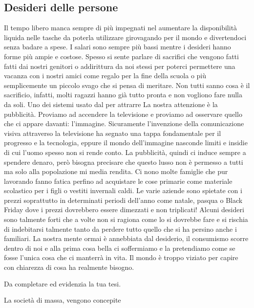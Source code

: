 \documentclass{article}
\begin{document}
\vspace{2cm}

\subsection{Desideri delle persone}

Il tempo libero manca sempre di più impegnati nel aumentare la disponibilità liquida
nelle tasche da poterla utilizzare girovagando per il mondo e divertendoci senza badare
a spese. I salari sono sempre più bassi mentre i desideri hanno forme più ampie e costose.
Spesso si sente parlare di sacrifici che vengono fatti fatti dai nostri genitori o
addirittura da noi stessi per poterci permettere una vacanza con i nostri amici come
regalo per la fine della scuola o più semplicemente un piccolo svago che si pensa di
meritare. 
Non tutti sanno cosa è il sacrificio, infatti, molti ragazzi hanno già tutto pronta
e non vogliono fare nulla da soli. Uno dei sistemi usato dal  per attrarre La nostra
 attenzione è la pubblicità. Proviamo ad accendere la televisione e proviamo ad osservare
 quello che ci appare davanti: l'immagine. Sicuramente l'invenzione della comunicazione
 visiva attraverso la televisione ha segnato una tappa fondamentale per il progresso e
 la tecnologia, eppure il mondo dell'immagine nasconde limiti e insidie di cui l'uomo
 spesso non si rende conto. La pubblicità, quindi ci induce sempre a spendere denaro,
 però bisogna precisare che questo lusso non è permesso a tutti ma solo alla popolazione
 mi media rendita. Ci nono molte famiglie che pur lavorando fanno fatica perfino ad 
 acquistare le cose primarie come materiale scolastico per i figli o vestiti invernali 
 caldi. Le varie aziende sono spietate con i prezzi soprattutto in determinati periodi
 dell’anno come natale, pasqua o Black Friday dove i prezzi dovrebbero essere dimezzati
 e non triplicati! Alcuni desideri sono talmente forti che a volte non si ragiona come 
 lo si dovrebbe fare e si rischia di indebitarsi talmente tanto da perdere tutto quello
 che si ha persino anche i familiari. La nostra mente ormai è annebbiata dal desiderio,
 il consumismo scorre dentro di noi e alla prima cosa bella ci soffermiamo e la pretendiamo
  come se fosse l’unica cosa che ci manterrà in vita. Il mondo è troppo viziato per capire
  con chiarezza di cosa ha realmente bisogno.

\vspace{1cm}
Da completare ed evidenzia la tua tesi.

La società di massa, vengono concepite 
\end{document}
